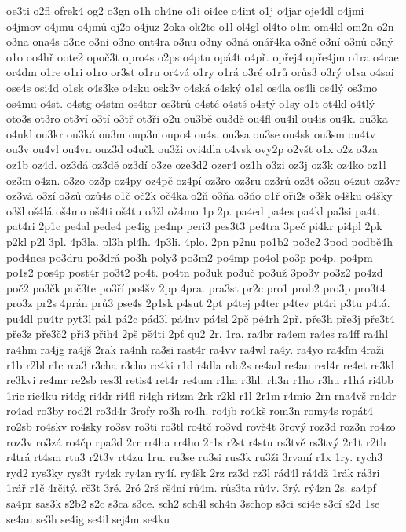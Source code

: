 {oe3ti
o2fl
ofrek4
og2
o3gn
o1h
oh4ne
o1i
oi4ce
o4int
o1j
o4jar
oje4dl
o4jmi
o4jmov
o4jmu
o4jmů
oj2o
o4juz
2oka
ok2te
o1l
ol4gl
ol4to
o1m
om4kl
om2n
o2n
o3na
ona4s
o3ne
o3ni
o3no
ont4ra
o3nu
o3ny
o3ná
onář4ka
o3ně
o3ní
o3nů
o3ný
o1o
oo4hř
oote2
opoč3t
opro4s
o2ps
o4ptu
opá4t
o4př.
opřej4
opře4jm
o1ra
o4rae
or4dm
o1re
o1ri
o1ro
or3st
o1ru
or4vá
o1ry
o1rá
o3ré
o1rů
orůs3
o3rý
o1sa
o4sai
ose4s
osi4d
o1sk
o4s3ke
o4sku
osk3v
o4ská
o4ský
o1sl
os4la
os4li
os4lý
os3mo
os4mu
o4st.
o4stg
o4stm
os4tor
os3trů
o4sté
o4stš
o4stý
o1sy
o1t
ot4kl
o4tlý
oto3s
ot3ro
ot3ví
o3tí
o3tř
ot3ři
o2u
ou3bě
ou3dě
ou4fl
ou4il
ou4is
ou4k.
ou3ka
o4ukl
ou3kr
ou3ká
ou3m
oup3n
oupo4
ou4s.
ou3sa
ou3se
ou4sk
ou3sm
ou4tv
ou3v
ou4vl
ou4vn
ouz3d
o4učk
ou3ži
ovi4dla
o4vsk
ovy2p
o2všt
o1x
o2z
o3za
oz1b
oz4d.
oz3dá
oz3dě
oz3dí
o3ze
oze3d2
ozer4
oz1h
o3zi
oz3j
oz3k
oz4ko
oz1l
oz3m
o4zn.
o3zo
oz3p
oz4py
oz4pě
oz4pí
oz3ro
oz3ru
oz3rů
oz3t
o3zu
o4zut
oz3vr
oz3vá
o3zí
o3zů
ozů4s
o1č
oč2k
oč4ka
o2ň
o3ňa
o3ňo
o1ř
oři2s
o3šk
o4šku
o4šky
o3šl
oš4lá
oš4mo
oš4ti
oš4ťu
o3žl
ož4mo
1p
2p.
pa4ed
pa4es
pa4kl
pa3si
pa4t.
pat4ri
2p1c
pe4al
pede4
pe4ig
pe4np
peri3
pes3t3
pe4tra
3peč
pi4kr
pi4pl
2pk
p2kl
p2l
3pl.
4p3la.
pl3h
pl4h.
4p3li.
4plo.
2pn
p2nu
po1b2
po3c2
3pod
podbě4h
pod4nes
po3dru
po3drá
po3h
poly3
po3m2
po4mp
po4ol
po3p
po4p.
po4pm
po1s2
pos4p
post4r
po3t2
po4t.
po4tn
po3uk
po3uč
po3už
3po3v
po3z2
po4zd
poč2
po3čk
poč3te
po3ří
po4šv
2pp
4pra.
pra3st
pr2c
pro1
prob2
pro3p
pro3t4
pro3z
pr2s
4prán
prů3
pse4s
2p1sk
p4sut
2pt
p4tej
p4ter
p4tev
pt4ri
p3tu
p4tá.
pu4dl
pu4tr
pyt3l
pá1
pá2c
pád3l
pá4nv
pá4sl
2pč
pé4rh
2př.
pře3h
pře3j
pře3t4
pře3z
pře3č2
při3
přih4
2pš
pš4ti
2pť
qu2
2r.
1ra.
ra4br
ra4em
ra4es
ra4ff
ra4hl
ra4hm
ra4jg
ra4jš
2rak
ra4nh
ra3si
rast4r
ra4vv
ra4wl
ra4y.
ra4yo
ra4ďm
4raži
r1b
r2bl
r1c
rca3
r3cha
r3cho
rc4ki
r1d
r4dla
rdo2s
re4ad
re4au
red4r
re4et
re3kl
re3kvi
re4mr
re2sb
res3l
retis4
ret4r
re4um
r1ha
r3hl.
rh3n
r1ho
r3hu
r1há
ri4bb
1ric
ric4ku
ri4dg
ri4dr
ri4fl
ri4gh
ri4zm
2rk
r2kl
r1l
2r1m
r4mio
2rn
rna4vš
rn4dr
ro4ad
ro3by
rod2l
ro3d4r
3rofy
ro3h
ro4h.
ro4jb
ro4kš
rom3n
romy4s
ropát4
ro2sb
ro4skv
ro4sky
ro3sv
ro3ti
ro3tl
ro4tč
ro3vd
rově4t
3rový
roz3d
roz3n
ro4zo
roz3v
ro3zá
ro4čp
rpa3d
2rr
rr4ha
rr4ho
2r1s
r2st
r4stu
rs3tvě
rs3tvý
2r1t
r2th
r4trá
rt4sm
rtu3
r2t3v
rt4zu
1ru.
ru3se
ru3si
rus3k
ru3ži
3rvaní
r1x
1ry.
rych3
ryd2
rys3ky
rys3t
ry4zk
ry4zn
ry4í.
ry4šk
2rz
rz3d
rz3l
rád4l
rá4dž
1rák
rá3ri
1rář
r1č
4rčitý.
rč3t
3ré.
2ró
2rš
rš4ní
rů4m.
růs3ta
rů4v.
3rý.
rý4zn
2s.
sa4pf
sa4pr
sas3k
s2b2
s2c
s3ca
s3ce.
sch2
sch4l
sch4n
3schop
s3ci
sci4e
s3cí
s2d
1se
se4au
se3h
se4ig
se4il
sej4m
se4ku
}
